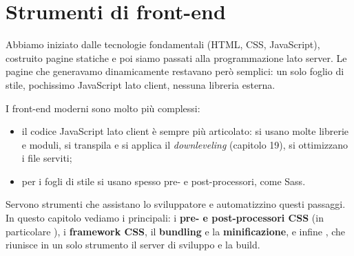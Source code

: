 \chapter{Strumenti di front-end}

\newcommand{\wtfrecciaterm}{\tikz[baseline=-0.6ex]{\draw[line width=1.3pt,
  -{Stealth[length=3.4pt,width=5pt]}, draw=consolefg] (0,0) -- (0.52em,0);}}
\newcommand{\wtglifi}{\lstset{extendedchars=true,
  literate={¤}{{\wtfrecciaterm}}1 {¢}{{✓}}1 {¦}{{│}}1 {¯}{{—}}1
           {¸}{{╷}}1 {¹}{{╵}}1 {¬}{{\textendash}}1}}

Abbiamo iniziato dalle tecnologie fondamentali (HTML, CSS, JavaScript),
costruito pagine statiche e poi siamo passati alla programmazione lato server.
Le pagine che generavamo dinamicamente restavano però semplici: un solo foglio
di stile, pochissimo JavaScript lato client, nessuna libreria esterna.

I front-end moderni sono molto più complessi:

\begin{itemize}
  \item il codice JavaScript lato client è sempre più articolato: si usano molte
        librerie e moduli, si transpila e si applica il \textit{downleveling}
        (capitolo 19), si ottimizzano i file serviti;
  \item per i fogli di stile si usano spesso pre- e post-processori, come Sass.
\end{itemize}

Servono strumenti che assistano lo sviluppatore e automatizzino questi
passaggi. In questo capitolo vediamo i principali: i \textbf{pre- e
post-processori CSS} (in particolare ), i \textbf{framework CSS}, il
\textbf{bundling} e la \textbf{minificazione}, e infine , che riunisce
in un solo strumento il server di sviluppo e la build.


